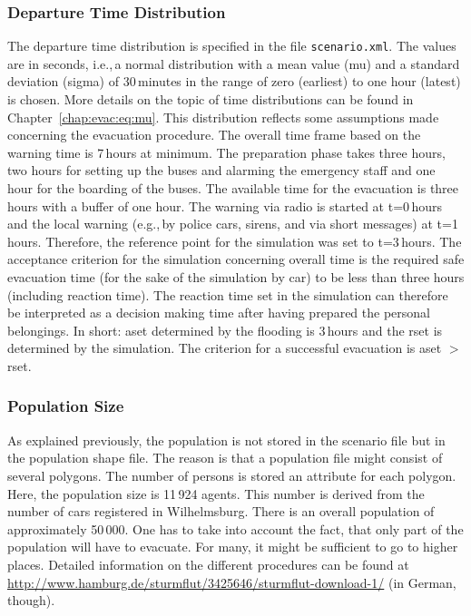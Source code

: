 \subsubsection{Departure Time Distribution}
The departure time distribution is specified in the file \lstinline|scenario.xml|. The values are in seconds, i.e.,\,a normal distribution with a mean value (mu) and a standard deviation (sigma) of 30\,minutes in the range of zero (earliest) to one hour (latest) is chosen. 
More details on the topic of time distributions can be found in Chapter~\ref{chap:evac:eq:mu}. This distribution reflects some assumptions made concerning the evacuation procedure. The overall time frame based on the warning time is 7\,hours at minimum. The preparation phase takes three hours, two hours for setting up the buses and alarming the emergency staff and one hour for the boarding of the buses. The available time for the evacuation is three hours with a buffer of one hour. 
The warning via radio is started at t=0\,hours and the local warning (e.g.,\,by police cars, sirens, and via short messages) at t=1\,hours. Therefore, the reference point for the simulation was set to t=3\,hours. The acceptance criterion for the simulation concerning overall time is the required safe evacuation time (for the sake of the simulation by car) to be less than three hours (including reaction time). The reaction time set in the simulation can therefore be interpreted as a decision making time after having prepared the personal belongings. In short: \gls{aset} determined by the flooding is 3\,hours and the \gls{rset} is determined by the simulation. The criterion for a successful evacuation is \gls{aset} $>$ \gls{rset}.

\subsubsection{Population Size}
As explained previously, the population is not stored in the scenario file but in the population shape file. The reason is that a population file might consist of several polygons. The number of persons is stored an attribute for each polygon. Here, the population size is 11\,924 agents. This number is derived from the number of cars registered in Wilhelmsburg. There is an overall population of approximately 50\,000. One has to take into account the fact, that only part of the population will have to evacuate. For many, it might be sufficient to go to higher places. Detailed information on the different procedures can be found at \url{http://www.hamburg.de/sturmflut/3425646/sturmflut-download-1/} (in German, though).

